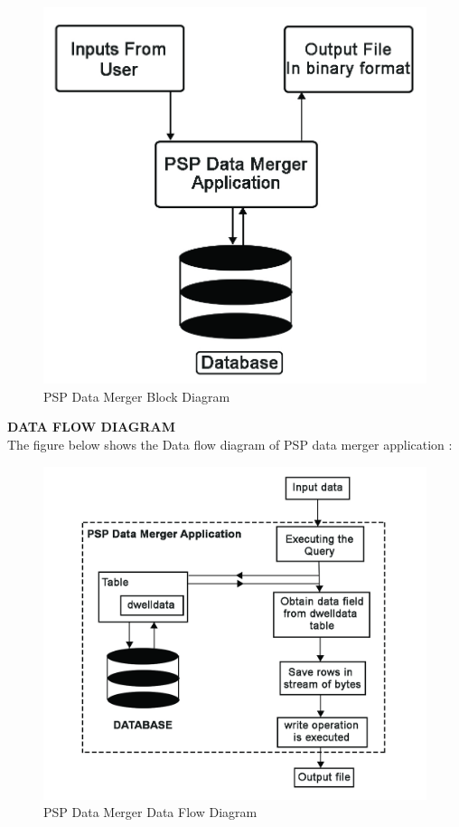 \documentclass[14pt]{article} %
\begin{document}
\begin{figure}[H]
    \centerline{\includegraphics[width=0.75\linewidth]{pspmergerblockdiagram.jpg}}
  \caption{PSP Data Merger Block Diagram}
  \label{fig:figure 12}
\end{figure}

 \noindent \textbf{DATA FLOW DIAGRAM}
\\ The figure below shows the Data flow diagram of PSP data merger application :
\begin{figure}[H]
    \centerline{\includegraphics[width=0.9\linewidth]{pspmergerflow.jpg}}
  \caption{PSP Data Merger Data Flow Diagram}
  \label{fig:figure 12}
\end{figure}
\end{document}
